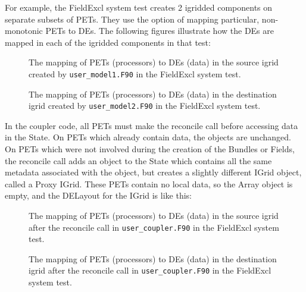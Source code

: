 \begin{enumerate}
For example, the FieldExcl system test creates 2 igridded components
on separate subsets of PETs.  They use the option of mapping
particular, non-monotonic PETs to DEs.  The following figures 
illustrate how the DEs are mapped in each of the igridded components
in that test:

\begin{center}
\begin{figure}
\caption{The mapping of PETs (processors) to DEs (data)
in the source igrid created by {\tt user\_model1.F90}
in the FieldExcl system test.}
\label{fig:excl_source}
\end{figure}
\end{center}

\begin{center}
\begin{figure}
\caption{The mapping of PETs (processors) to DEs (data)
in the destination igrid created by {\tt user\_model2.F90}
in the FieldExcl system test.}
\label{fig:excl_destination}
\end{figure}
\end{center}

In the coupler code, all PETs must make the reconcile call before
accessing data in the State.  On PETs which already contain data,
the objects are unchanged.  On PETs which were not involved during
the creation of the Bundles or Fields, the reconcile call adds an
object to the State which contains all the same metadata associated
with the object, but creates a slightly different IGrid object,
called a Proxy IGrid. These PETs contain no local data, so the
Array object is empty, and the DELayout for the IGrid is like this:

\begin{center}
\begin{figure}
\caption{The mapping of PETs (processors) to DEs (data)
in the source igrid after the reconcile call in {\tt user\_coupler.F90}
in the FieldExcl system test.}
\label{fig:excl_source}
\end{figure}
\end{center}

\begin{center}
\begin{figure}
\caption{The mapping of PETs (processors) to DEs (data)
in the destination igrid after the reconcile call in {\tt user\_coupler.F90}
in the FieldExcl system test.}
\label{fig:excl_destination}
\end{figure}
\end{center}

\end{enumerate}
